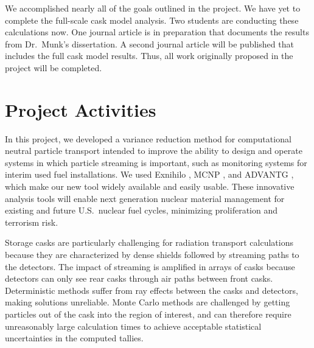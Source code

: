 \documentclass[12pt]{article}
\begin{document}
We accomplished nearly all of the goals outlined in the project. We have yet to complete the full-scale cask model analysis. Two students are conducting these calculations now. One journal article is in preparation that documents the results from Dr.\ Munk's dissertation. A second journal article will be published that includes the full cask model results. Thus, all work originally proposed in the project will be completed.



%
\section{Project Activities}
\label{sect::project}

In this project, we developed a variance reduction method for computational neutral particle transport intended to improve the ability to design and operate systems in which particle streaming is important, such as monitoring systems for interim used fuel installations. 
We used Exnihilo \cite{evans_denovo:_2010}, MCNP \cite{brown_mcnp_2002}, and ADVANTG \cite{mosher_new_2010}, which make our new tool widely available and easily usable. 
These innovative analysis tools will enable next generation nuclear material management for existing and future U.S.\ nuclear fuel cycles, minimizing proliferation and terrorism risk.

Storage casks are particularly challenging for radiation transport calculations because they are characterized by dense shields followed by streaming paths to the detectors. 
The impact of streaming is amplified in arrays of casks because detectors can only see rear casks through air paths between front casks. 
Deterministic methods suffer from ray effects between the casks and detectors, making solutions unreliable. 
Monte Carlo methods are challenged by getting particles out of the cask into the region of interest, and can therefore require unreasonably large calculation times to achieve acceptable statistical uncertainties in the computed tallies.
\end{document}
